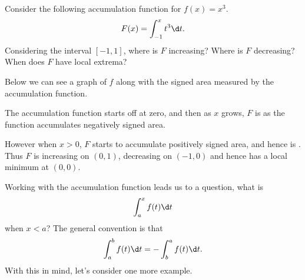 \documentclass{ximera}
\begin{document}
\begin{example} 
Consider the following accumulation function for $f(x) = x^3$.
\[
F(x) = \int_{-1}^x t^3 \d t.
\]
Considering the interval $[-1,1]$, where is $F$ increasing? Where
is $F$ decreasing? When does $F$ have local extrema?

\begin{explanation}
Below we can see a graph of $f$ along with the signed area measured by the
accumulation function.
\begin{image}
\end{image}
The accumulation function starts off at zero, and then as $x$ grows,
$F$ is  as
the function accumulates negatively signed area.

However when $x>0$, $F$ starts to accumulate positively signed area,
and hence is
. Thus $F$
is increasing on $(0,1)$, decreasing on $(-1,0)$ and hence has a local
minimum at $(0,0)$.
\end{explanation}
\end{example}

Working with the accumulation function leads us to a question, what is
\[
\int_a^x f(t) \d t
\]
when $x< a$? The general convention is that 
\[
\int_a^b f(t) \d t = -\int_b^a f(t) \d t. 
\]
With this in mind, let's consider one more example.
\end{document}
